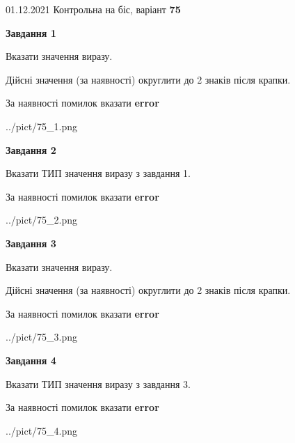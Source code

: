 \documentclass[11pt, ukrainian]{article}
\begin{document}
{01.12.2021 Контрольна на біс, варіант  \No \textbf { 75 }\par}
{
\begin {large}
{\begin {center}\textbf{Завдання 1}\end {center}}\par
Вказати значення виразу. \par
Дійсні значення (за наявності) округлити до 2 знаків після крапки. \par
За наявності помилок вказати \textbf{error}

\begin{center}
	{../pict/75_1.png}
\end{center}
\newpage

{\begin {center}\textbf{Завдання 2}\end {center}}\par
Вказати ТИП значення виразу з завдання 1. \par
За наявності помилок вказати \textbf{error}

\begin{center}
	{../pict/75_2.png}
\end{center}
\newpage

{\begin {center}\textbf{Завдання 3}\end {center}}\par
Вказати значення виразу. \par
Дійсні значення (за наявності) округлити до 2 знаків після крапки. \par
За наявності помилок вказати \textbf{error}

\begin{center}
	{../pict/75_3.png}
\end{center}
\newpage

{\begin {center}\textbf{Завдання 4}\end {center}}\par
Вказати ТИП значення виразу з завдання 3. \par
За наявності помилок вказати \textbf{error}

\begin{center}
	{../pict/75_4.png}
\end{center}
\newpage


\end{large}}
\end{document}
